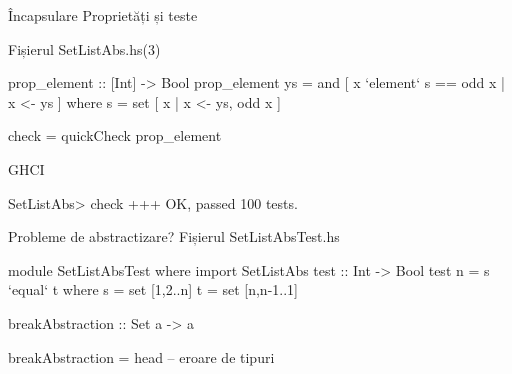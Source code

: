 \documentclass[handout,xcolor=pdftex,romanian,colorlinks]{beamer}
\begin{document}
\begin{frame}[fragile]{Încapsulare}
{Proprietăți și teste}
\begin{block}{Fișierul SetListAbs.hs\hfill (3)}
\begin{asciihs}
prop_element :: [Int] -> Bool
prop_element ys =
    and [ x `element` s == odd x | x <- ys ]
  where
    s = set [ x | x <- ys, odd x ]

check =
    quickCheck prop_element
\end{asciihs}
\end{block}
\begin{block}{GHCI}
\begin{asciihs}
SetListAbs> check
+++ OK, passed 100 tests.
\end{asciihs}
\end{block}
\end{frame}


\begin{frame}[fragile]{Probleme de abstractizare?}
{Fișierul SetListAbsTest.hs}
\begin{asciihs}
module SetListAbsTest where
import SetListAbs
test :: Int -> Bool
test n =
   s `equal` t
  where
    s = set [1,2..n]
    t = set [n,n-1..1]

breakAbstraction :: Set a -> a
\end{asciihs}
\vspace{-2ex}
\begin{asciihs}
breakAbstraction = head   --  eroare de tipuri
\end{asciihs}
\end{frame}
\end{document}
